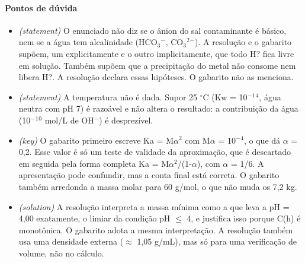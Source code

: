 \documentclass{article}%
\begin{document}
\paragraph{Pontos de dúvida}%
\begin{itemize}%
\item%
\textit{(statement)} O enunciado não diz se o ânion do sal contaminante é básico, nem se a água tem alcalinidade (HCO$_{3}$$^{-}$, CO$_{3}$$^2$$^{-}$). A resolução e o gabarito supõem, um explicitamente e o outro implicitamente, que todo H? fica livre em solução. Também supõem que a precipitação do metal não consome nem libera H?. A resolução declara essas hipóteses. O gabarito não as menciona.%
\item%
\textit{(statement)} A temperatura não é dada. Supor 25 $^\circ$C (Kw = 10$^{-}$$^{1}$$^{4}$, água neutra com pH 7) é razoável e não altera o resultado: a contribuição da água (10$^{-}$$^{1}$$^{0}$ mol/L de OH$^{-}$) é desprezível.%
\item%
\textit{(key)} O gabarito primeiro escreve Ka = M$\alpha$$^2$ com M$\alpha$ = 10$^{-}$$^{4}$, o que dá $\alpha$ = 0,2. Esse valor é só um teste de validade da aproximação, que é descartado em seguida pela forma completa Ka = M$\alpha$$^2$/(1-$\alpha$), com $\alpha$ = 1/6. A apresentação pode confundir, mas a conta final está correta. O gabarito também arredonda a massa molar para 60 g/mol, o que não muda os 7,2 kg.%
\item%
\textit{(solution)} A resolução interpreta a massa mínima como a que leva a pH = 4,00 exatamente, o limiar da condição pH $\leq$ 4, e justifica isso porque C(h) é monotônica. O gabarito adota a mesma interpretação. A resolução também usa uma densidade externa ($\approx$ 1,05 g/mL), mas só para uma verificação de volume, não no cálculo.%
\end{itemize}%
\end{document}
